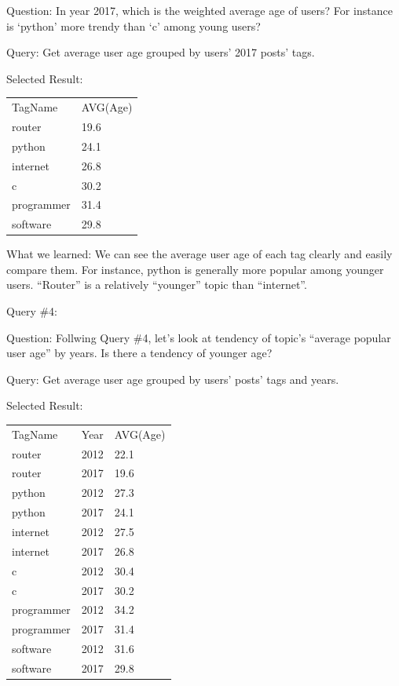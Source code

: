 Question: 	In year 2017, which is the weighted average age of users? For instance is ‘python’ more trendy than ‘c’ among young users? 

Query: 		Get average user age grouped by users’ 2017 posts’ tags. 
 
Selected Result:

\begin {center}
\begin{tabular}{ l l  }

TagName&AVG(Age)\\router&19.6\\python&24.1\\internet&26.8\\c&30.2\\programmer&31.4\\software&29.8\\

\end{tabular}
\end {center}


 
What we learned:	We can see the average user age of each tag clearly and easily compare them. For instance, python is generally more popular among younger users. “Router” is a relatively “younger” topic than “internet”. 
 
Query \#4:

Question: 	Follwing Query \#4, let’s look at tendency of topic’s “average popular user age” by years. Is there a tendency of younger age?
 
Query: 		Get average user age grouped by users’ posts’ tags and years. 
 
Selected Result:

\begin {center}
\begin{tabular}{ l l  l}
	
TagName&Year&AVG(Age)\\router&2012&22.1\\router&2017&19.6\\python&2012&27.3\\python&2017&24.1\\internet&2012&27.5\\internet&2017&26.8\\c&2012&30.4\\c&2017&30.2\\programmer&2012&34.2\\programmer&2017&31.4\\software&2012&31.6\\software&2017&29.8\\
	
\end{tabular}
\end {center}
 
